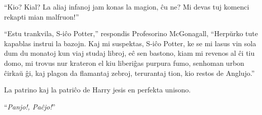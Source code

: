 ``Kio? Kial? La aliaj infanoj jam konas la magion, ĉu ne? Mi devas tuj komenci
rekapti mian malfruon!''

``Estu trankvila, S-iĉo Potter,'' respondis Profesorino McGonagall, ``Herpŭrko
tute kapablas instrui la bazojn. Kaj mi suspektas, S-iĉo Potter, ke se mi lasus
vin sola dum du monatoj kun viaj studaj libroj, eĉ sen bastono, kiam mi revenos
al ĉi tiu domo, mi trovus nur krateron el kiu liberiĝas purpura fumo, senhoman
urbon ĉirkaŭ ĝi, kaj plagon da flamantaj zebroj, terurantaj tion, kio restos de
Anglujo.''

La patrino kaj la patriĉo de Harry jesis en perfekta unisono.

``\emph{Panjo!, Paĉjo!}''
